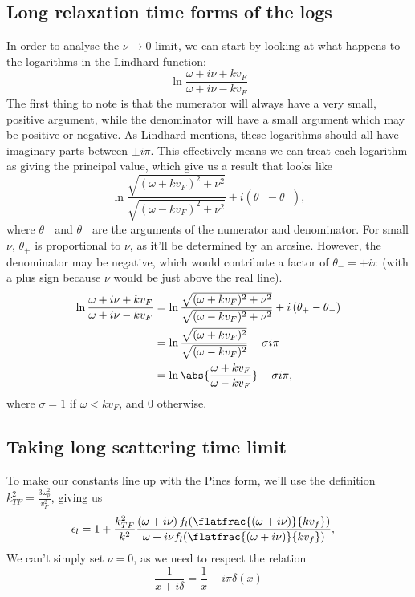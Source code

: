 \documentclass[../../main.tex]{subfiles}
\newcommand{\vf}{v_F}
\begin{document}
\subsection{Long relaxation time forms of the logs}
In order to analyse the $\nu \rightarrow 0$ limit, we can start by looking at what happens to the logarithms in the Lindhard function:
\begin{equation}
	\ln\frac{\omega + i \nu + k\vf}{\omega + i \nu - k\vf}
\end{equation}
The first thing to note is that the numerator will always have a very small, positive argument, while the denominator will have a small argument which may be positive or negative. As Lindhard mentions, these logarithms should all have imaginary parts between $\pm i \pi$. This effectively means we can treat each logarithm as giving the principal value, which give us a result that looks like
\begin{equation}
	\ln\frac{\sqrt{(\omega + k\vf) ^2 + \nu^2}}{\sqrt{(\omega - k\vf) ^2 + \nu^2}} + i \left(\theta_+ - \theta_- \right),
\end{equation}
where $\theta_+$ and $\theta_-$ are the arguments of the numerator and denominator. For small $\nu$, $\theta_+$ is proportional to $\nu$, as it'll be determined by an arcsine. However, the denominator may be negative, which would contribute a factor of $\theta_- = +i\pi$ (with a plus sign because $\nu$ would be just above the real line).
\begin{align}
	\ln\frac{\omega + i \nu + k\vf}{\omega + i \nu - k\vf} &= \ln\frac{\sqrt{(\omega + k\vf) ^2 + \nu^2}}{\sqrt{(\omega - k\vf) ^2 + \nu^2}} + i \left(\theta_+ - \theta_- \right) \\
	&= \ln\frac{\sqrt{(\omega + k\vf) ^2}}{\sqrt{(\omega - k\vf) ^2}} - \sigma i \pi \\
	&= \ln\abs{\frac{\omega + k\vf}{\omega - k\vf}} - \sigma i \pi,
\end{align}
where $\sigma = 1$ if $\omega < k\vf$, and $0$ otherwise.

\subsection{Taking long scattering time limit}

To make our constants line up with the Pines form, we'll use the definition $k_{TF}^2 = \frac{3 \omega_p^2}{\vf^2}$, giving us 
\begin{align} 
 \epsilon_l &= 1 + \frac{k_{TF}^2}{k^2} \frac{\left(\omega + i \nu \right) f_l(\flatfrac{(\omega + i \nu)}{k v_f})}{\omega + i \nu f_l(\flatfrac{(\omega + i \nu)}{k v_f})},
\end{align}
We can't simply set $\nu = 0$, as we need to respect the relation
\begin{equation}
	\frac{1}{x + i \delta} = \frac{1}{x} - i \pi \delta(x)	
\end{equation}
\end{document}
